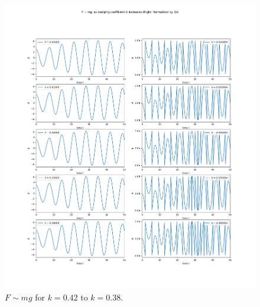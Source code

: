 \documentclass[10pt, twocolumn]{article}
\begin{document}
\begin{figure}[H]
    \centering
    \includegraphics[width = \columnwidth]{Projects/ForcedSimplePendulum/Plots/F~mg as damping coefficient k increases from 0.42 to 0.38.png}
    \caption{$F \sim{mg}$ for $k = 0.42$ to $k = 0.38$.}
    \label{k 0.42 to 0.38}
\end{figure}
\end{document}

